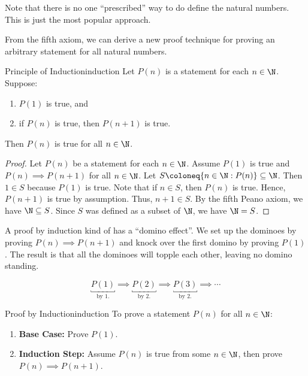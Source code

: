 \documentclass[12pt]{report}
\begin{document}
\begin{notebox}
    Note that there is no one ``prescribed'' way to do define the natural numbers. This is just the most popular approach.
\end{notebox}

From the fifth axiom, we can derive a new proof technique for proving an arbitrary statement for all natural numbers.

\begin{thmbox}{Principle of Induction}{induction}
    Let $P(n)$ is a statement for each $n \in \N$. Suppose:
    \begin{enumerate}
        \item $P(1)$ is true, and
        \item if $P(n)$ is true, then $P(n+1)$ is true.
    \end{enumerate}
    Then $P(n)$ is true for all $n \in \N$.
    \tcblower
    \begin{proof}
        Let $P(n)$ be a statement for each $n \in \N$. Assume $P(1)$ is true and $P(n) \implies P(n+1)$ for all $n \in \N$. Let $S \coloneq \{ n \in \N : P(n) \} \subseteq \N$. Then $1 \in S$ because $P(1)$ is true. Note that if $n \in S$, then $P(n)$ is true. Hence, $P(n+1)$ is true by assumption. Thus, $n+1 \in S$. By the fifth Peano axiom, we have $\N \subseteq S$. Since $S$ was defined as a subset of $\N$, we have $\N = S$.
    \end{proof}
\end{thmbox}

A proof by induction kind of has a ``domino effect''. We set up the dominoes by proving $P(n) \implies P(n+1)$ and knock over the first domino by proving $P(1)$. The result is that all the dominoes will topple each other, leaving no domino standing.

\[ \underbracket{P(1)}_{\text{by 1.}} \implies \underbracket{P(2)}_{\text{by 2.}} \implies \underbracket{P(3)}_{\text{by 2.}} \implies \cdots \]

\begin{tecbox}{Proof by Induction}{induction}
    To prove a statement $P(n)$ for all $n \in \N$:
    \begin{enumerate}
        \item \textbf{Base Case:} Prove $P(1)$.
        \item \textbf{Induction Step:} Assume $P(n)$ is true from some $n \in \N$, then prove $P(n) \implies P(n+1)$.
    \end{enumerate}
\end{tecbox}
\end{document}
